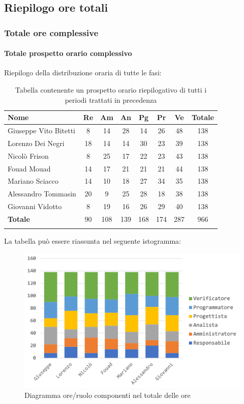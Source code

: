 	\subsection{Riepilogo ore totali}
		\subsubsection{Totale ore complessive}
			\paragraph{Totale prospetto orario complessivo}
			Riepilogo della distribuzione oraria di tutte le fasi:
			\begin{longtable}{|l|c|c|c|c|c|c|c|}
				\hline
				\rowcolor{lighter-grayer}
				\textbf{Nome} & \textbf{Re} & \textbf{Am} & \textbf{An} & \textbf{Pg}  & \textbf{Pr}   & \textbf{Ve} & \textbf{Totale} \\
				\hline
				\endfirsthead
				
				\hline
				Giuseppe Vito Bitetti 		& 8 & 14 & 28 & 14 & 26 & 48 & 138\\
				\hline
				\hline
				Lorenzo Dei Negri			& 18 & 14 & 14 & 30 & 23 & 39 & 138\\
				\hline
				\hline
				Nicolò Frison				    & 8 & 25 & 17 & 22 & 23 & 43 & 138\\
				\hline
				\hline
				Fouad Mouad 				 & 14 & 17 & 21 & 21 & 21 & 44 & 138\\
				\hline
				\hline
				Mariano Sciacco 			& 14 & 10 & 18 & 27 & 34 & 35 & 138\\
				\hline
				\hline
				Alessandro Tommasin    & 20 & 9 & 25 & 28 & 18 & 38 & 138\\
				\hline
				\hline
				Giovanni Vidotto 			 & 8 & 19 & 16 & 26 & 29 & 40 & 138\\
				\hline 
				\textbf{Totale}				 & 90 & 108 & 139 & 168 & 174 & 287 & 966\\
				\hline
				\caption{Tabella contenente un prospetto orario riepilogativo di tutti i periodi trattati in precedenza}
			\end{longtable}
			
			La tabella può essere riassunta nel seguente istogramma:
			\begin{figure}[H]
				\centering
				\includegraphics[width=0.8\linewidth]{./images/preventivo/totOre1.png}
				\caption{Diagramma ore/ruolo componenti nel totale delle ore}
				\label{fig:diagramma suddivione ruoli totale ore}
			\end{figure}
			\pagebreak
			
